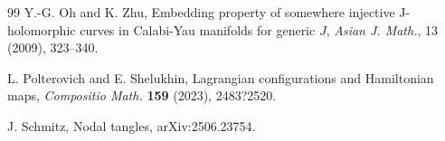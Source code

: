 \documentclass[12pt]{amsart}
\theoremstyle{definition}
\begin{document}
\begin{thebibliography} {99}
 Y.-G. Oh and K. Zhu,  Embedding property of somewhere injective
J-holomorphic curves in Calabi-Yau manifolds for generic $J$, {\it Asian J. Math.}, 13
(2009), 323--340.


 L. Polterovich and E. Shelukhin, Lagrangian configurations and Hamiltonian maps, {\em Compositio Math.} \textbf{159} (2023), 2483?2520.















 J. Schmitz, Nodal tangles, arXiv:2506.23754.





\end{thebibliography}
\end{document}
